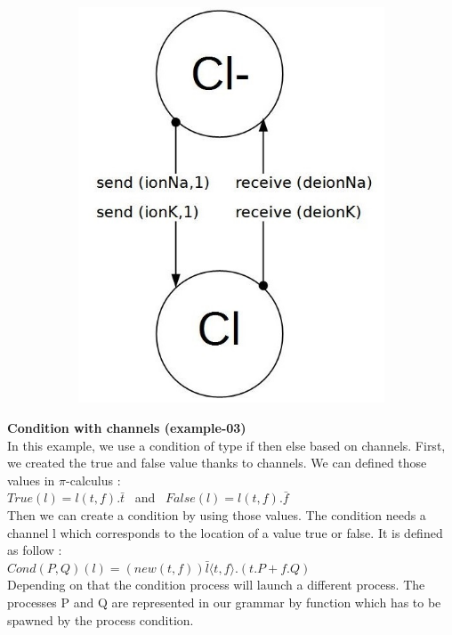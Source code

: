 \documentclass[11pt]{report}
\begin{document}
\begin{figure}[!h]
\begin{subfigure}[b]{0.3\textwidth}
        \includegraphics[width=\textwidth]{Cl.jpg}
    \end{subfigure}
\end{figure}

{}
\tabto{0cm} {\LARGE \textbf{Condition with channels (example-03)}}
\vspace*{3pt}
\\
In this example, we use a condition of type if then else based on channels. First, we created the true and false value thanks to channels. We can defined those values in $\pi$-calculus : \\
$True(l) = l(t,f). \bar{t}$ \ and \ $False(l) = l(t,f). \bar{f}$
\\ Then we can create a condition by using those values.
The condition needs a channel l which corresponds to the location of a value true or false. It is defined as follow : \\
$ Cond(P,Q)(l) = (new (t,f)) \bar{l} \langle t,f \rangle .(t.P + f.Q)$
\\Depending on that the condition process will launch a different process. The processes P and Q are represented in our grammar by function which has to be spawned by the process condition. 
\newpage
\end{document}
